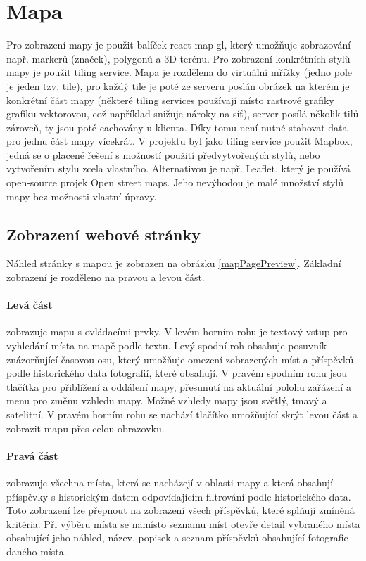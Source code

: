 \documentclass[12pt, a4paper,
 twoside,        %
 openright
]{report}
\begin{document}
\section{Mapa}
    Pro zobrazení mapy je použit balíček react-map-gl, který umožňuje zobrazování např. markerů (značek), polygonů a 3D terénu. Pro zobrazení konkrétních stylů mapy je použit tiling service. Mapa je rozdělena do virtuální mřížky (jedno pole je jeden tzv. tile), pro každý tile je poté ze serveru poslán obrázek na kterém je konkrétní část mapy (některé tiling services používají místo rastrové grafiky grafiku vektorovou, což například snižuje nároky na síť), server posílá několik tilů zároveň, ty jsou poté cachovány u klienta. Díky tomu není nutné stahovat data pro jednu část mapy vícekrát. V projektu byl jako tiling service použit Mapbox, jedná se o placené řešení s možností použití předvytvořených stylů, nebo vytvořením stylu zcela vlastního. Alternativou je např. Leaflet, který je používá open-source projek Open street maps. Jeho nevýhodou je malé množství stylů mapy bez možnosti vlastní úpravy.
    \subsection{Zobrazení webové stránky}
    Náhled stránky s mapou je zobrazen na obrázku \ref{mapPagePreview}. Základní zobrazení je rozděleno na pravou a levou část.
    \paragraph{Levá část} zobrazuje mapu s ovládacími prvky. V levém horním rohu je textový vstup pro vyhledání místa na mapě podle textu. Levý spodní roh obsahuje posuvník znázorňující časovou osu, který umožňuje omezení zobrazených míst a příspěvků podle historického data fotografií, které obsahují. V pravém spodním rohu jsou tlačítka pro přiblížení a oddálení mapy, přesunutí na aktuální polohu zařázení a menu pro změnu vzhledu mapy. Možné vzhledy mapy jsou světlý, tmavý a satelitní. V pravém horním rohu se nachází tlačítko umožňující skrýt levou část a zobrazit mapu přes celou obrazovku.
    \paragraph{Pravá část} zobrazuje všechna místa, která se nacházejí v oblasti mapy a která obsahují příspěvky s historickým datem odpovídajícím filtrování podle historického data. Toto zobrazení lze přepnout na zobrazení všech příspěvků, které splňují zmíněná kritéria. Při výběru místa se namísto seznamu míst otevře detail vybraného místa obsahující jeho náhled, název, popisek a seznam příspěvků obsahující fotografie daného místa.
\end{document}
